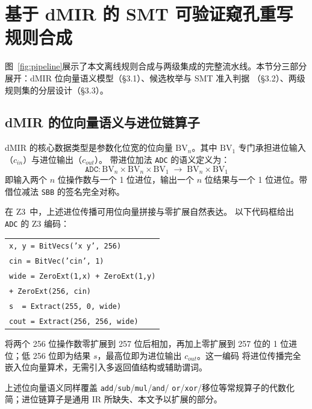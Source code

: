 \section{基于 dMIR 的 SMT 可验证窥孔重写规则合成}

图~\ref{fig:pipeline}展示了本文离线规则合成与两级集成的完整流水线。本节分三部分展开：dMIR 位向量语义模型（§3.1）、候选枚举与 SMT 准入判据
（§3.2）、两级规则集的分层设计（§3.3）。



\subsection{dMIR 的位向量语义与进位链算子}

dMIR 的核心数据类型是参数化位宽的位向量 $\mathrm{BV}_n$。其中
$\mathrm{BV}_1$ 专门承担进位输入（$c_{in}$）与进位输出（$c_{out}$）。
带进位加法 \texttt{ADC} 的语义定义为：
\[
  \texttt{ADC}: \mathrm{BV}_n \times \mathrm{BV}_n \times \mathrm{BV}_1
  \;\to\; \mathrm{BV}_n \times \mathrm{BV}_1
\]
\noindent 即输入两个 $n$ 位操作数与一个 1 位进位，输出一个 $n$ 位结果与一个
1 位进位。带借位减法 \texttt{SBB} 的签名完全对称。

在 Z3~\cite{demoura2008z3}中，上述进位传播可用位向量拼接与零扩展自然表达。
以下代码框给出 \texttt{ADC} 的 Z3 编码：

\begin{center}
\small
\begin{tabular}{@{}l@{}}
\texttt{x, y = BitVecs('x y', 256)} \\
\texttt{cin = BitVec('cin', 1)} \\
\texttt{wide = ZeroExt(1,x) + ZeroExt(1,y)} \\
\texttt{\quad\quad\quad + ZeroExt(256, cin)} \\
\texttt{s\enspace\enspace\, = Extract(255, 0, wide)} \\
\texttt{cout = Extract(256, 256, wide)}
\end{tabular}
\end{center}

\noindent 将两个 256 位操作数零扩展到 257 位后相加，再加上零扩展到 257 位的
1 位进位；低 256 位即为结果 $s$，最高位即为进位输出 $c_{out}$。这一编码
将进位传播完全嵌入位向量算术，无需引入多返回值结构或辅助谓词。

上述位向量语义同样覆盖 \texttt{add}/\texttt{sub}/\texttt{mul}/\texttt{and}/
\texttt{or}/\texttt{xor}/移位等常规算子的代数化简；进位链算子是通用 IR
所缺失、本文予以扩展的部分。

